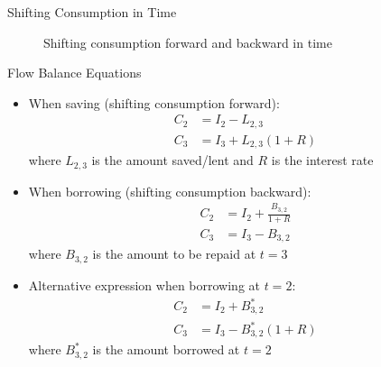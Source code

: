 \documentclass[10pt]{beamer}
\begin{document}
\begin{frame}{Shifting Consumption in Time}
\begin{figure}
  \caption{Shifting consumption forward and backward in time}
\end{figure}
\end{frame}

\begin{frame}{Flow Balance Equations}
  \begin{itemize}[<+->]
    \item When saving (shifting consumption forward):
      \begin{align*}
        C_2 &= I_2 - L_{2,3} \\
        C_3 &= I_3 + L_{2,3}(1 + R)
      \end{align*}
      where $L_{2,3}$ is the amount saved/lent and $R$ is the interest rate
    \item When borrowing (shifting consumption backward):
      \begin{align*}
        C_2 &= I_2 + \tfrac{B_{3,2}}{1 + R} \\
        C_3 &= I_3 - B_{3,2}
      \end{align*}
      where $B_{3,2}$ is the amount to be repaid at $t=3$
    \item Alternative expression when borrowing at $t=2$:
      \begin{align*}
        C_2 &= I_2 + B^*_{3,2} \\
        C_3 &= I_3 - B^*_{3,2}(1 + R)
      \end{align*}
      where $B^*_{3,2}$ is the amount borrowed at $t=2$
  \end{itemize}
\end{frame}
\end{document}
